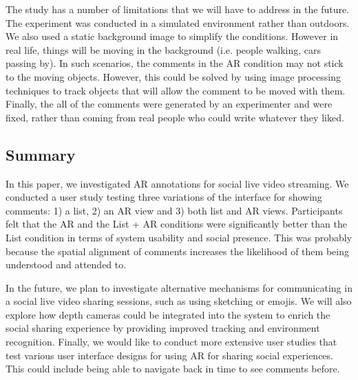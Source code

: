 The study has a number of limitations that we will have to address in the future. The experiment was conducted in a simulated environment rather than outdoors. We also used a static background image to simplify the conditions. However in real life, things will be moving in the background (i.e. people walking, cars passing by). In such scenarios, the comments in the AR condition may not stick to the moving objects. However, this could be solved by using image processing techniques to track objects that will allow the comment to be moved with them. Finally, the all of the comments were generated by an experimenter and were fixed, rather than coming from real people who could write whatever they liked.    

\subsection{Summary}

In this paper, we investigated AR annotations for social live video streaming. We conducted a user study testing three variations of the interface for showing comments: 1) a list, 2) an AR view and 3) both list and AR views. Participants felt that the AR and the List + AR conditions were significantly better than the List condition in terms of system usability and social presence. This was probably because the spatial alignment of comments increases the likelihood of them being understood and attended to.

In the future, we plan to investigate alternative mechanisms for communicating in a social live video sharing sessions, such as using sketching or emojis. We will also explore how depth cameras could be integrated into the system to enrich the social sharing experience by providing improved tracking and environment recognition. Finally, we would like to conduct more extensive user studies that test various user interface designs for using AR for sharing social experiences. This could include being able to navigate back in time to see comments before. 
